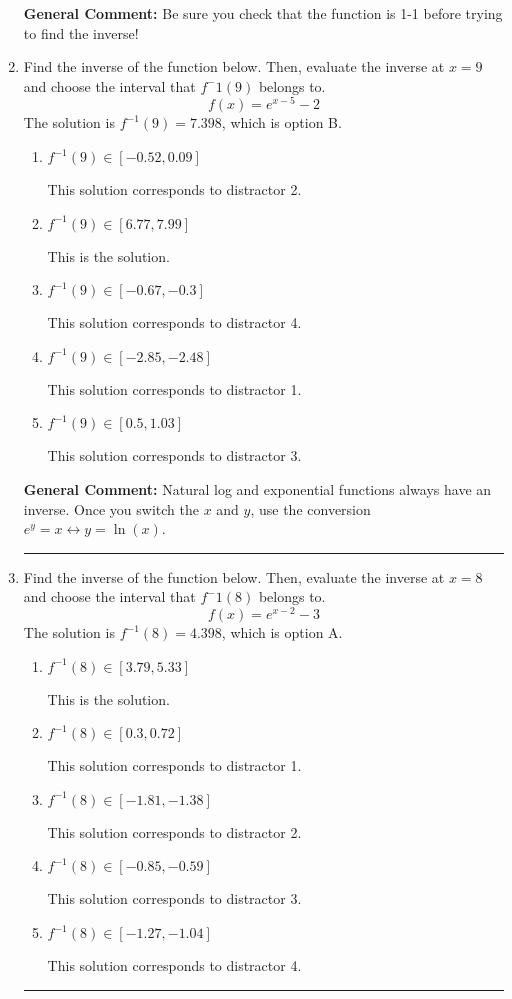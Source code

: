 \documentclass{extbook}[14pt]
\newcommand{\litem}[1]{\item #1

\rule{\textwidth}{0.4pt}}
\begin{document}
\begin{enumerate}
{\textbf{General Comment:} Be sure you check that the function is 1-1 before trying to find the inverse!
}
\litem{
Find the inverse of the function below. Then, evaluate the inverse at $x = 9$ and choose the interval that $f^-1(9)$ belongs to.
\[ f(x) = e^{x-5}-2 \]The solution is \( f^{-1}(9) = 7.398 \), which is option B.\begin{enumerate}[label=\Alph*.]
\item \( f^{-1}(9) \in [-0.52, 0.09] \)

 This solution corresponds to distractor 2.
\item \( f^{-1}(9) \in [6.77, 7.99] \)

 This is the solution.
\item \( f^{-1}(9) \in [-0.67, -0.3] \)

 This solution corresponds to distractor 4.
\item \( f^{-1}(9) \in [-2.85, -2.48] \)

 This solution corresponds to distractor 1.
\item \( f^{-1}(9) \in [0.5, 1.03] \)

 This solution corresponds to distractor 3.
\end{enumerate}

\textbf{General Comment:} Natural log and exponential functions always have an inverse. Once you switch the $x$ and $y$, use the conversion $ e^y = x \leftrightarrow y=\ln(x)$.
}
\litem{
Find the inverse of the function below. Then, evaluate the inverse at $x = 8$ and choose the interval that $f^-1(8)$ belongs to.
\[ f(x) = e^{x-2}-3 \]The solution is \( f^{-1}(8) = 4.398 \), which is option A.\begin{enumerate}[label=\Alph*.]
\item \( f^{-1}(8) \in [3.79, 5.33] \)

 This is the solution.
\item \( f^{-1}(8) \in [0.3, 0.72] \)

 This solution corresponds to distractor 1.
\item \( f^{-1}(8) \in [-1.81, -1.38] \)

 This solution corresponds to distractor 2.
\item \( f^{-1}(8) \in [-0.85, -0.59] \)

 This solution corresponds to distractor 3.
\item \( f^{-1}(8) \in [-1.27, -1.04] \)

 This solution corresponds to distractor 4.
\end{enumerate}

}
\end{enumerate}
\end{document}
